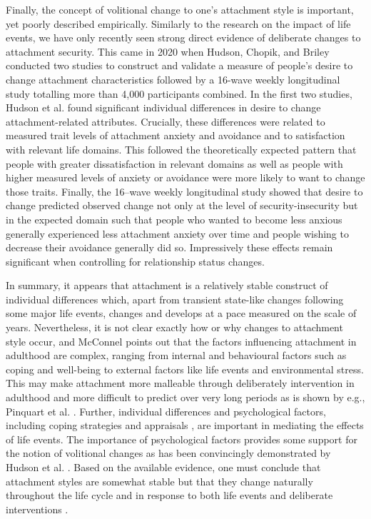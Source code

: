 \documentclass[12pt]{report}
\begin{document}
Finally, the concept of volitional change to one's attachment style is important, yet poorly described empirically. Similarly to the research on the impact of life events, we have only recently seen strong direct evidence of deliberate changes to attachment security. This came in 2020 when Hudson, Chopik, and Briley \cite{Hudson2020} conducted two studies to construct and validate a measure of people's desire to change attachment characteristics followed by a 16-wave weekly longitudinal study totalling more than 4,000 participants combined.
In the first two studies, Hudson et al. found significant individual differences in desire to change attachment-related attributes. Crucially, these differences were related to measured trait levels of attachment anxiety and avoidance and to satisfaction with relevant life domains. This followed the theoretically expected pattern that people with greater dissatisfaction in relevant domains as well as people with higher measured levels of anxiety or avoidance were more likely to want to change those traits.
Finally, the 16–wave weekly longitudinal study showed that desire to change predicted observed change not only at the level of security-insecurity but in the expected domain such that people who wanted to become less anxious generally experienced less attachment anxiety over time and people wishing to decrease their avoidance generally did so. Impressively these effects remain significant when controlling for relationship status changes.


In summary, it appears that attachment is a relatively stable construct of individual differences which, apart from transient state-like changes following some major life events, changes and develops at a pace measured on the scale of years. Nevertheless, it is not clear exactly how or why changes to attachment style occur, and McConnel \cite{McConnell2011} points out that the factors influencing attachment in adulthood are complex, ranging from internal and behavioural factors such as coping and well-being to external factors like life events and environmental stress. This may make attachment more malleable through deliberately intervention in adulthood and more difficult to predict over very long periods as is shown by e.g., Pinquart et al. \cite{Pinquart2013}.
Further, individual differences and psychological factors, including coping strategies \cite{Zhang2004} and appraisals \cite{Fraley2021}, are important in mediating the effects of life events. The importance of psychological factors provides some support for the notion of volitional changes as has been convincingly demonstrated by Hudson et al. \cite{Hudson2020}.
Based on the available evidence, one must conclude that attachment styles are somewhat stable but that they change naturally throughout the life cycle \cite{Rowe2005,Doherty2004,Fraley1997} and in response to both life events \cite{Fraley2021} and deliberate interventions \cite{Hudson2020}.
\end{document}
